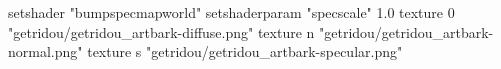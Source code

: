setshader "bumpspecmapworld"
setshaderparam "specscale" 1.0
texture 0 "getridou/getridou_artbark-diffuse.png"
texture n "getridou/getridou_artbark-normal.png"
texture s "getridou/getridou_artbark-specular.png"
